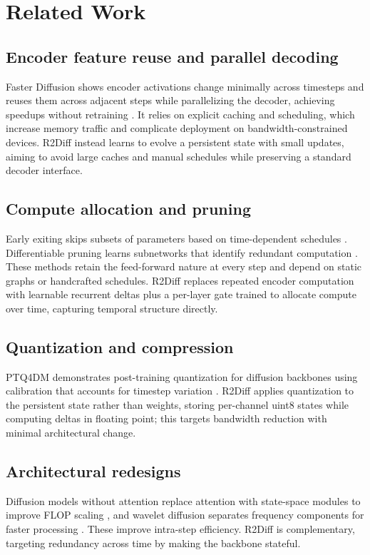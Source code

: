 \documentclass{article}
\begin{document}
\section{Related Work}
\subsection{Encoder feature reuse and parallel decoding}
Faster Diffusion shows encoder activations change minimally across timesteps and reuses them across adjacent steps while parallelizing the decoder, achieving speedups without retraining \cite{li-2023-faster}. It relies on explicit caching and scheduling, which increase memory traffic and complicate deployment on bandwidth-constrained devices. R2Diff instead learns to evolve a persistent state with small updates, aiming to avoid large caches and manual schedules while preserving a standard decoder interface.

\subsection{Compute allocation and pruning}
Early exiting skips subsets of parameters based on time-dependent schedules \cite{moon-2024-simple}. Differentiable pruning learns subnetworks that identify redundant computation \cite{zhu-2024-dip}. These methods retain the feed-forward nature at every step and depend on static graphs or handcrafted schedules. R2Diff replaces repeated encoder computation with learnable recurrent deltas plus a per-layer gate trained to allocate compute over time, capturing temporal structure directly.

\subsection{Quantization and compression}
PTQ4DM demonstrates post-training quantization for diffusion backbones using calibration that accounts for timestep variation \cite{shang-2022-post}. R2Diff applies quantization to the persistent state rather than weights, storing per-channel uint8 states while computing deltas in floating point; this targets bandwidth reduction with minimal architectural change.

\subsection{Architectural redesigns}
Diffusion models without attention replace attention with state-space modules to improve FLOP scaling \cite{yan-2023-diffusion}, and wavelet diffusion separates frequency components for faster processing \cite{phung-2022-wavelet}. These improve intra-step efficiency. R2Diff is complementary, targeting redundancy across time by making the backbone stateful.
\end{document}
